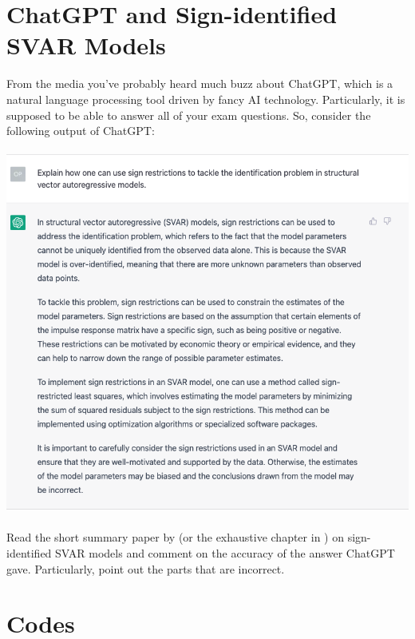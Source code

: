 \documentclass{article}
\begin{document}
\newpage

\section[ChatGPT and Sign-identified SVAR Models]{ChatGPT and Sign-identified SVAR Models\label{ex:ChatGPTSignSVAR}}
From the media you've probably heard much buzz about ChatGPT,
  which is a natural language processing tool driven by fancy AI technology.
Particularly, it is supposed to be able to answer all of your exam questions.
So, consider the following output of ChatGPT:
\\~\\
\includegraphics[width=\textwidth]{plots/ChatGPTSignRestrictions.png}
~\\
\noindent Read the short summary paper by \textcite{Wolf_2022_WhatCanWe} (or the exhaustive chapter in \textcite[Ch.~13]{Kilian.Lutkepohl_2017_StructuralVectorAutoregressive})
on sign-identified SVAR models and comment on the accuracy of the answer ChatGPT gave.
Particularly, point out the parts that are incorrect.


\newpage


\appendix

\printbibliography
\newpage
\section{Codes}

\end{document}
